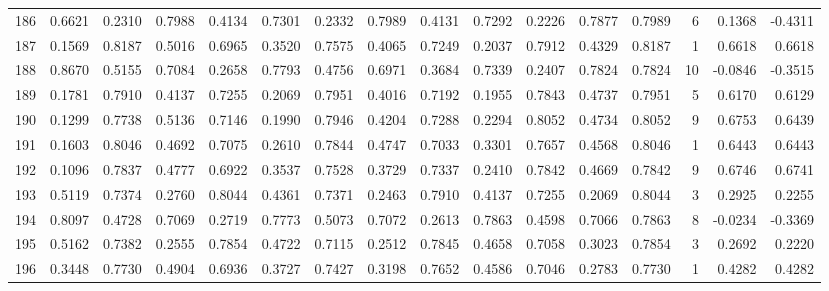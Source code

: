 \begin{tabular}{lrrrrrrrrrrrrrrr}
186 &      0.6621 &  0.2310 &  0.7988 &  0.4134 &  0.7301 &  0.2332 &  0.7989 &  0.4131 &  0.7292 &  0.2226 &   0.7877 &     0.7989 &      6 &                    0.1368 &                    -0.4311 \\
187 &      0.1569 &  0.8187 &  0.5016 &  0.6965 &  0.3520 &  0.7575 &  0.4065 &  0.7249 &  0.2037 &  0.7912 &   0.4329 &     0.8187 &      1 &                    0.6618 &                     0.6618 \\
188 &      0.8670 &  0.5155 &  0.7084 &  0.2658 &  0.7793 &  0.4756 &  0.6971 &  0.3684 &  0.7339 &  0.2407 &   0.7824 &     0.7824 &     10 &                   -0.0846 &                    -0.3515 \\
189 &      0.1781 &  0.7910 &  0.4137 &  0.7255 &  0.2069 &  0.7951 &  0.4016 &  0.7192 &  0.1955 &  0.7843 &   0.4737 &     0.7951 &      5 &                    0.6170 &                     0.6129 \\
190 &      0.1299 &  0.7738 &  0.5136 &  0.7146 &  0.1990 &  0.7946 &  0.4204 &  0.7288 &  0.2294 &  0.8052 &   0.4734 &     0.8052 &      9 &                    0.6753 &                     0.6439 \\
191 &      0.1603 &  0.8046 &  0.4692 &  0.7075 &  0.2610 &  0.7844 &  0.4747 &  0.7033 &  0.3301 &  0.7657 &   0.4568 &     0.8046 &      1 &                    0.6443 &                     0.6443 \\
192 &      0.1096 &  0.7837 &  0.4777 &  0.6922 &  0.3537 &  0.7528 &  0.3729 &  0.7337 &  0.2410 &  0.7842 &   0.4669 &     0.7842 &      9 &                    0.6746 &                     0.6741 \\
193 &      0.5119 &  0.7374 &  0.2760 &  0.8044 &  0.4361 &  0.7371 &  0.2463 &  0.7910 &  0.4137 &  0.7255 &   0.2069 &     0.8044 &      3 &                    0.2925 &                     0.2255 \\
194 &      0.8097 &  0.4728 &  0.7069 &  0.2719 &  0.7773 &  0.5073 &  0.7072 &  0.2613 &  0.7863 &  0.4598 &   0.7066 &     0.7863 &      8 &                   -0.0234 &                    -0.3369 \\
195 &      0.5162 &  0.7382 &  0.2555 &  0.7854 &  0.4722 &  0.7115 &  0.2512 &  0.7845 &  0.4658 &  0.7058 &   0.3023 &     0.7854 &      3 &                    0.2692 &                     0.2220 \\
196 &      0.3448 &  0.7730 &  0.4904 &  0.6936 &  0.3727 &  0.7427 &  0.3198 &  0.7652 &  0.4586 &  0.7046 &   0.2783 &     0.7730 &      1 &                    0.4282 &                     0.4282 \\

\end{tabular}
